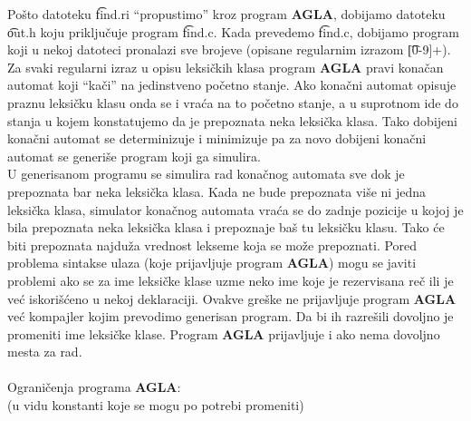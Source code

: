       Po\v sto datoteku \t{find.ri} ``propustimo'' kroz program {\bf AGLA},
      dobijamo datoteku \t{out.h} koju priklju\v cuje program \t{find.c}.
      Kada prevedemo \t{find.c}, dobijamo program koji u nekoj datoteci
      pronalazi sve brojeve (opisane regularnim izrazom \t{[0-9]+}).
%
%
      Za svaki regularni izraz u opisu leksi\v ckih klasa program
      {\bf AGLA} pravi kona\-\v can automat koji ``ka\v ci'' na
      jedinstveno po\v cetno stanje.
      Ako kona\v cni automat opisuje praznu leksi\v cku klasu onda se i
      vra\'ca na to po\v cetno stanje, a u supro\-tnom ide do stanja u
      kojem konstatujemo da je prepoznata neka leksi\v cka klasa.
      Tako dobijeni kona\v cni automat se determinizuje i minimizuje pa za
      novo dobijeni kona\v cni automat se generi\v se program koji ga
      simulira.\\
      U generisanom programu se simulira rad kona\v cnog automata sve dok
      je prepoznata bar neka leksi\v cka klasa.
      Kada ne bude prepoznata vi\v se ni jedna leksi\v cka klasa,
      simulator kona\v cnog automata vra\'ca se do zadnje pozicije u kojoj
      je bila prepoznata neka leksi\v cka klasa i prepoznaje ba\v s tu
      leksi\v cku klasu.
      Tako \'ce biti prepoznata najdu\v za vrednost lekseme koja se
      mo\v ze prepoznati.
%
%
      Pored problema sintakse ulaza (koje prijavljuje program {\bf AGLA})
      mogu se javiti problemi ako se za ime leksi\v cke klase uzme neko
      ime koje je rezervisana re\v c ili je ve\'c iskori\v s\'ceno u
      nekoj deklaraciji.
      Ovakve gre\v ske ne prijavljuje program {\bf AGLA} ve\'c kompajler
      kojim prevodimo generisan program.
      Da bi ih razre\v sili dovoljno je promeniti ime leksi\v cke klase.
      Program {\bf AGLA} prijavljuje i ako nema dovoljno mesta za rad.\\
      \\
      Ograni\v cenja programa {\bf AGLA}:\\
      (u vidu konstanti koje se mogu po potrebi promeniti)
